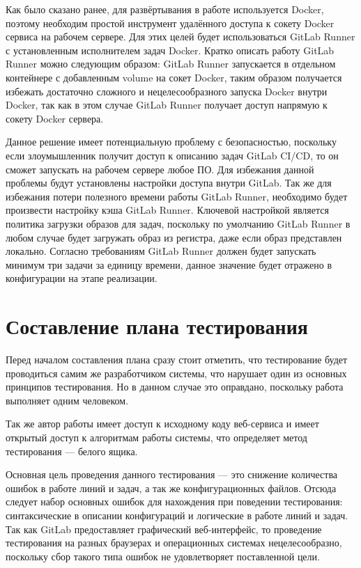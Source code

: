 Как было сказано ранее, для развёртывания в работе используется Docker, поэтому необходим простой инструмент удалённого доступа к сокету Docker сервиса на рабочем сервере.
Для этих целей будет использоваться GitLab Runner с установленным исполнителем задач Docker.
Кратко описать работу GitLab Runner можно следующим образом: GitLab Runner запускается в отдельном контейнере с добавленным volume на сокет Docker,
таким образом получается избежать достаточно сложного и нецелесообразного запуска Docker внутри Docker,
так как в этом случае GitLab Runner получает доступ напрямую к сокету Docker сервера.

Данное решение имеет потенциальную проблему с безопасностью, поскольку если злоумышленник получит доступ к описанию задач GitLab CI/CD, то он сможет запускать на рабочем сервере любое ПО.
Для избежания данной проблемы будут установлены настройки доступа внутри GitLab.
Так же для избежания потери полезного времени работы GitLab Runner, необходимо будет произвести настройку кэша GitLab Runner.
Ключевой настройкой является политика загрузки образов для задач, поскольку по умолчанию GitLab Runner в любом случае будет загружать образ из регистра, даже если образ представлен локально.
Согласно требованиям GitLab Runner должен будет запускать минимум три задачи за единицу времени, данное значение будет отражено в конфигурации на этапе реализации.

\section{Составление плана тестирования}

Перед началом составления плана сразу стоит отметить, что тестирование будет проводиться самим же разработчиком системы, что нарушает один из основных принципов тестирования.
Но в данном случае это оправдано, поскольку работа выполняет одним человеком.

Так же автор работы имеет доступ к исходному коду веб-сервиса и имеет открытый доступ к алгоритмам работы системы, что определяет метод тестирования --- белого ящика.

Основная цель проведения данного тестирования --- это снижение количества ошибок в работе линий и задач, а так же конфигурационных файлов.
Отсюда следует набор основных ошибок для нахождения при поведении тестирования: синтаксические в описании конфигураций и логические в работе линий и задач.
Так как GitLab предоставляет графический веб-интерфейс, то проведение тестирования на разных браузерах и операционных системах нецелесообразно,
поскольку сбор такого типа ошибок не удовлетворяет поставленной цели.


